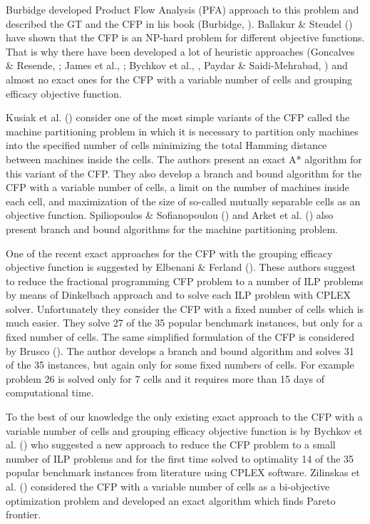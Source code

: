\documentclass[citeauthoryear]{llncs}
\begin{document}
Burbidge developed Product Flow Analysis (PFA) approach to this problem and described the GT and the CFP in his book (Burbidge, \cite{Burbidge_1}).
Ballakur \& Steudel (\cite{Ballakur_Steudel}) have shown that the CFP is an NP-hard problem for different objective functions. That is why there have been developed a lot of heuristic approaches (Goncalves \& Resende, \cite{19}; James et al., \cite{4}; Bychkov et al., \cite{Bychkov_heur}, Paydar \& Saidi-Mehrabad, \cite{2}) and almost no exact ones for the CFP with a variable number of cells and grouping efficacy objective function.

Kusiak et al. (\cite{22}) consider one of the most simple variants of the CFP called the machine partitioning problem in which it is necessary to partition only machines into the specified number of cells minimizing the total Hamming distance between machines inside the cells. The authors present an exact A* algorithm for this variant of the CFP. They also develop a branch and bound algorithm for the CFP with a variable number of cells, a limit on the number of machines inside each cell, and maximization of the size of so-called mutually separable cells as an objective function. Spiliopoulos \& Sofianopoulou (\cite{23}) and Arket et al. (\cite{21}) also present branch and bound algorithms for the machine partitioning problem.

One of the recent exact approaches for the CFP with the grouping efficacy objective function is suggested by Elbenani \& Ferland (\cite{1}). These authors suggest to reduce the fractional programming CFP problem to a number of ILP problems by means of Dinkelbach approach and to solve each ILP problem with CPLEX solver. Unfortunately they consider the CFP with a fixed number of cells which is much easier. They solve 27 of the 35 popular benchmark instances, but only for a fixed number of cells. The same simplified formulation of the CFP is considered by Brusco (\cite{51}). The author develops a branch and bound algorithm and solves 31 of the 35 instances, but again only for some fixed numbers of cells. For example problem 26 is solved only for 7 cells and it requires more than 15 days of computational time.

To the best of our knowledge the only existing exact approach to the CFP with a variable number of cells and grouping efficacy objective function is by Bychkov et al. (\cite{Bychkov}) who suggested a new approach to reduce the CFP problem to a small number of ILP problems and for the first time solved to optimality 14 of the 35 popular benchmark instances from literature using CPLEX software.
Zilinskas et al. (\cite{Zilinskas}) considered the CFP with a variable number of cells as a bi-objective optimization problem and developed an exact algorithm which finds Pareto frontier.
\end{document}
